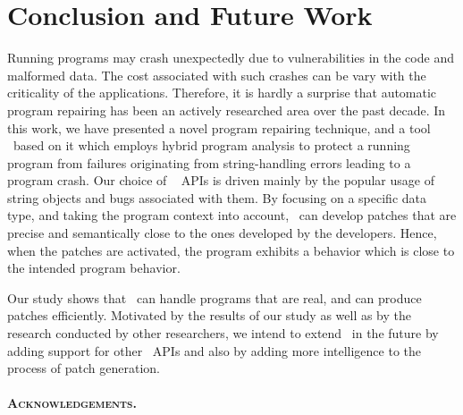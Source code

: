 \section{Conclusion and Future Work}
\label{sec:conc}

Running programs may crash unexpectedly due to vulnerabilities in the code and
malformed data.
The cost associated with such crashes can be vary with the criticality of the
applications. Therefore, it is hardly a surprise that automatic program
repairing has been an actively researched area over the past decade.
In this work, we have presented a novel program repairing technique, and a tool
\tool\ based on it which employs hybrid program analysis to protect a running
program from failures originating from string-handling errors leading to a
program crash.
Our choice of \java\  APIs is driven mainly by the popular usage of
string objects and bugs associated with them.
By focusing on a specific data type, and taking the program context into
account, \tool\ can develop patches that are precise and  semantically close to
the ones developed by the developers.
Hence, when the patches are activated, the program exhibits a behavior which is
close to the intended program behavior.

Our study shows that \tool\ can handle programs that are real, and can produce
patches efficiently. Motivated by the results of our study as well as by the
research conducted by other researchers, we intend to extend \tool\ in the
future by adding support for other \java\ APIs and also by adding more
intelligence to the process of patch generation.

\paragraph{\textsc{Acknowledgements.}} 

